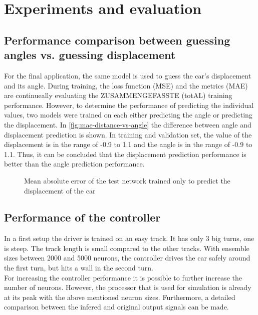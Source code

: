 \documentclass[10pt,a4paper,twoside,journal]{IEEEtran}
\begin{document}
\section{Experiments and evaluation}
\label{sc:evaluation}

\subsection{Performance comparison between guessing angles vs. guessing displacement}
For the final application, the same model is used to guess the car's displacement and its angle. During training, the loss function (MSE) and the metrics (MAE) are continueally evaluating the ZUSAMMENGEFASSTE (totAL) training performance. However, to determine the performance of predicting the individual values, two models were trained on each either predicting the angle or predicting the displacement. In \autoref{fig:mae-distance-vs-angle} the difference between angle and displacement prediction is shown. In training and validation set, the value of the displacement is in the range of -0.9 to 1.1 and the angle is in the range of -0.9 to 1.1. Thus, it can be concluded that the displacement prediction performance is better than the angle prediction performance. 

\begin{figure}
	\centering
	\caption{Mean absolute error of the test network trained only to predict the displacement of the car}
	\label{fig:mae-distance-vs-angle}
\end{figure}

\subsection{Performance of the controller}
In a first setup the driver is trained on an easy track. It has only 3 big turns, one is steep. The track length is small compared to the other tracks. With ensemble sizes between 2000 and 5000 neurons, the controller drives the car safely around the first turn, but hits a wall in the second turn. \\
For increasing the controller performance it is possible to further increase the number of neurons. However, the processor that is used for simulation is already at its peak with the above mentioned neuron sizes. Furthermore, a detailed comparison between the infered and original output signals can be made. 
\end{document}
